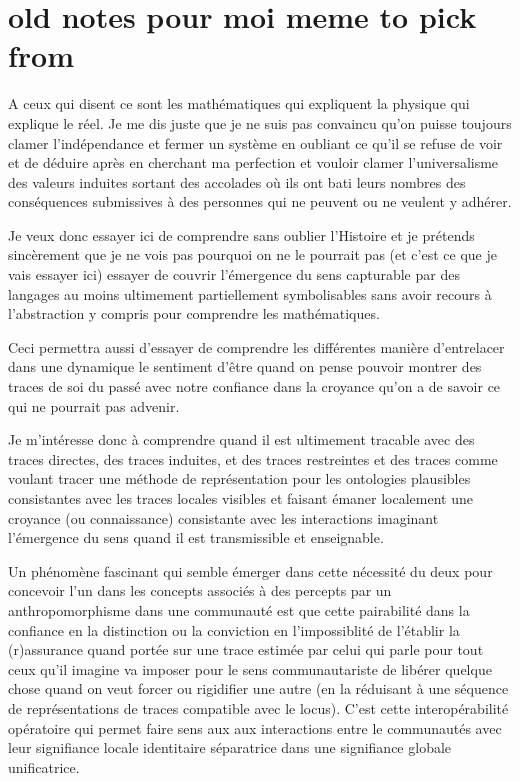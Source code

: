 \documentclass{article}
\begin{document}
\section{old notes pour moi meme to pick from}
A ceux qui disent ce sont les mathématiques qui expliquent la physique qui explique le réel.
Je me dis juste que je ne suis pas convaincu qu'on puisse toujours clamer l'indépendance et fermer un système en oubliant ce qu'il se refuse de voir
et de déduire après en cherchant ma perfection et vouloir clamer l'universalisme des valeurs induites sortant des accolades où ils ont bati leurs nombres des conséquences submissives à des personnes qui ne peuvent ou ne veulent y adhérer.

Je veux donc essayer ici de comprendre sans oublier l'Histoire et je prétends sincèrement que je ne vois pas pourquoi on ne le  pourrait pas (et  c'est ce que je vais essayer ici)  essayer de  couvrir l'émergence du sens capturable par des  langages au moins ultimement partiellement  symbolisables  sans avoir recours à l'abstraction y compris pour comprendre les mathématiques.

Ceci permettra aussi d'essayer de comprendre les différentes manière d'entrelacer dans une dynamique le sentiment d'être quand on pense pouvoir montrer des traces de soi du passé avec notre confiance dans la croyance qu'on a de savoir ce qui ne pourrait pas advenir.

Je m'intéresse donc à comprendre quand il est ultimement tracable avec des traces directes, des traces induites, et des traces restreintes et des traces  comme
 voulant tracer une méthode de représentation pour les ontologies plausibles consistantes avec les traces locales visibles et faisant émaner localement  une croyance (ou connaissance)  consistante avec les interactions imaginant l'émergence  
du sens quand il est transmissible et enseignable.

Un phénomène fascinant qui semble émerger dans cette nécessité du deux pour concevoir l'un dans les concepts associés à des percepts  par un anthropomorphisme dans une communauté est que cette pairabilité dans la  confiance en la distinction ou la conviction en l'impossiblité de l'établir  la (r)assurance quand portée sur une  trace estimée par celui qui parle pour tout ceux qu'il imagine va imposer pour le sens
 communautariste de libérer quelque chose quand on veut forcer ou rigidifier une autre (en la réduisant à une séquence de représentations de traces compatible avec le locus). C'est cette interopérabilité opératoire  qui permet faire sens aux aux interactions entre le communautés avec leur signifiance locale identitaire séparatrice dans une signifiance globale unificatrice.  
  
\end{document}
